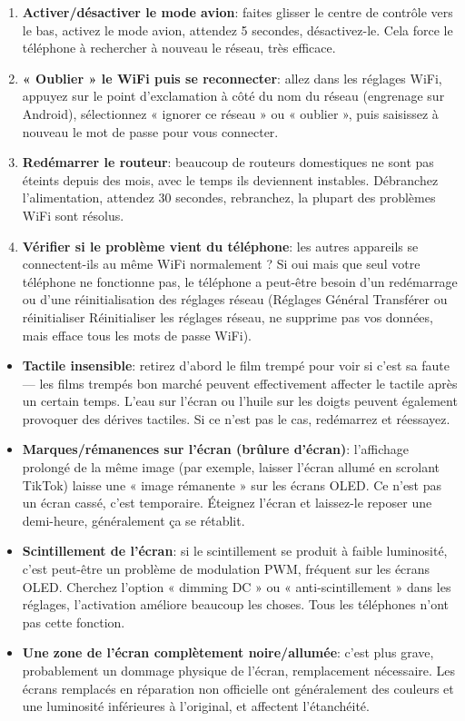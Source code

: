 \begin{enumerate}
  \item \textbf{Activer/désactiver le mode avion}: faites glisser le centre de contrôle vers le bas, activez le mode avion, attendez 5 secondes, désactivez-le. Cela force le téléphone à rechercher à nouveau le réseau, très efficace.
  \item \textbf{« Oublier » le WiFi puis se reconnecter}: allez dans les réglages WiFi, appuyez sur le point d'exclamation à côté du nom du réseau (engrenage sur Android), sélectionnez « ignorer ce réseau » ou « oublier », puis saisissez à nouveau le mot de passe pour vous connecter.
  \item \textbf{Redémarrer le routeur}: beaucoup de routeurs domestiques ne sont pas éteints depuis des mois, avec le temps ils deviennent instables. Débranchez l'alimentation, attendez 30 secondes, rebranchez, la plupart des problèmes WiFi sont résolus.
  \item \textbf{Vérifier si le problème vient du téléphone}: les autres appareils se connectent-ils au même WiFi normalement ? Si oui mais que seul votre téléphone ne fonctionne pas, le téléphone a peut-être besoin d'un redémarrage ou d'une réinitialisation des réglages réseau (Réglages Général Transférer ou réinitialiser Réinitialiser les réglages réseau, ne supprime pas vos données, mais efface tous les mots de passe WiFi).
\end{enumerate}


\begin{itemize}
  \item \textbf{Tactile insensible}: retirez d'abord le film trempé pour voir si c'est sa faute — les films trempés bon marché peuvent effectivement affecter le tactile après un certain temps. L'eau sur l'écran ou l'huile sur les doigts peuvent également provoquer des dérives tactiles. Si ce n'est pas le cas, redémarrez et réessayez.
  \item \textbf{Marques/rémanences sur l'écran (brûlure d'écran)}: l'affichage prolongé de la même image (par exemple, laisser l'écran allumé en scrolant TikTok) laisse une « image rémanente » sur les écrans OLED. Ce n'est pas un écran cassé, c'est temporaire. Éteignez l'écran et laissez-le reposer une demi-heure, généralement ça se rétablit.
  \item \textbf{Scintillement de l'écran}: si le scintillement se produit à faible luminosité, c'est peut-être un problème de modulation PWM, fréquent sur les écrans OLED. Cherchez l'option « dimming DC » ou « anti-scintillement » dans les réglages, l'activation améliore beaucoup les choses. Tous les téléphones n'ont pas cette fonction.
  \item \textbf{Une zone de l'écran complètement noire/allumée}: c'est plus grave, probablement un dommage physique de l'écran, remplacement nécessaire. Les écrans remplacés en réparation non officielle ont généralement des couleurs et une luminosité inférieures à l'original, et affectent l'étanchéité.
\end{itemize}

